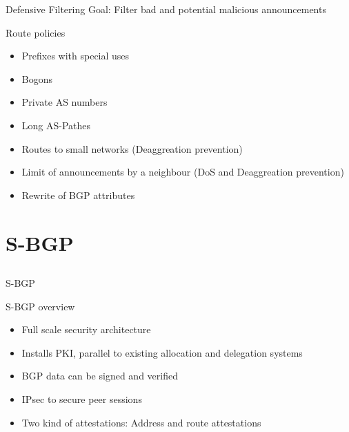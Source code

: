 \documentclass[notes=hide,yellow]{beamer}
\begin{document}
\begin{frame}{Defensive Filtering}
	Goal: Filter bad and potential malicious announcements
\end{frame}
\begin{frame}
	\begin{block}{Route policies}
\begin{itemize}
	\item Prefixes with special uses
	\item Bogons %
	\item Private AS numbers
	\item Long AS-Pathes
	\item Routes to small networks (Deaggreation prevention)
	\item Limit of announcements by a neighbour (DoS and Deaggreation prevention)
	\item Rewrite of BGP attributes
\end{itemize}
\end{block}
\end{frame}

\section{S-BGP}
\subsection*{}
\begin{frame}{S-BGP}
	\begin{block}{S-BGP overview}
		\begin{itemize}
			\item Full scale security architecture
			\item Installs PKI, parallel to existing allocation and delegation systems
			\item BGP data can be signed and verified
			\item IPsec to secure peer sessions
			\item Two kind of attestations: Address and route attestations
		\end{itemize}
	\end{block}
\end{frame}
\end{document}

